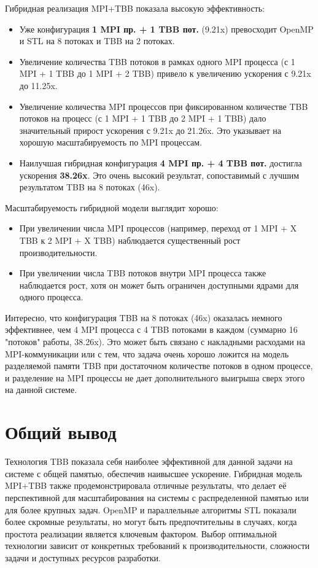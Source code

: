 \documentclass[a4paper,12pt]{article}
\begin{document}
Гибридная реализация MPI+TBB показала высокую эффективность:
\begin{itemize}
    \item Уже конфигурация \textbf{1 MPI пр. + 1 TBB пот.} (9.21x) превосходит OpenMP и STL на 8 потоках и TBB на 2 потоках.
    \item Увеличение количества TBB потоков в рамках одного MPI процесса (с 1 MPI + 1 TBB до 1 MPI + 2 TBB) привело к увеличению ускорения с 9.21x до 11.25x.
    \item Увеличение количества MPI процессов при фиксированном количестве TBB потоков на процесс (с 1 MPI + 1 TBB до 2 MPI + 1 TBB) дало значительный прирост ускорения с 9.21x до 21.26x. Это указывает на хорошую масштабируемость по MPI процессам.
    \item Наилучшая гибридная конфигурация \textbf{4 MPI пр. + 4 TBB пот.} достигла ускорения \textbf{38.26x}. Это очень высокий результат, сопоставимый с лучшим результатом TBB на 8 потоках (46x).
\end{itemize}
Масштабируемость гибридной модели выглядит хорошо:
\begin{itemize}
    \item При увеличении числа MPI процессов (например, переход от 1 MPI + X TBB к 2 MPI + X TBB) наблюдается существенный рост производительности.
    \item При увеличении числа TBB потоков внутри MPI процесса также наблюдается рост, хотя он может быть ограничен доступными ядрами для одного процесса.
\end{itemize}
Интересно, что конфигурация TBB на 8 потоках (46x) оказалась немного эффективнее, чем 4 MPI процесса с 4 TBB потоками в каждом (суммарно 16 "потоков" работы, 38.26x). Это может быть связано с накладными расходами на MPI-коммуникации или с тем, что задача очень хорошо ложится на модель разделяемой памяти TBB при достаточном количестве потоков в одном процессе, и разделение на MPI процессы не дает дополнительного выигрыша сверх этого на данной системе.

\section*{Общий вывод}
Технология TBB показала себя наиболее эффективной для данной задачи на системе с общей памятью, обеспечив наивысшее ускорение. Гибридная модель MPI+TBB также продемонстрировала отличные результаты, что делает её перспективной для масштабирования на системы с распределенной памятью или для более крупных задач. OpenMP и параллельные алгоритмы STL показали более скромные результаты, но могут быть предпочтительны в случаях, когда простота реализации является ключевым фактором. Выбор оптимальной технологии зависит от конкретных требований к производительности, сложности задачи и доступных ресурсов разработки.
\end{document}
